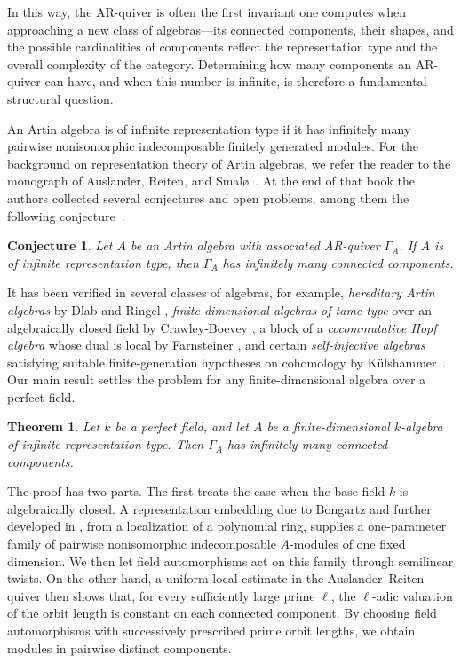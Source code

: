 \documentclass[11pt,letterpaper,reqno]{amsart}
\newtheorem{theorem}{Theorem}[section]
\newtheorem{conjecture}[conjecture]{Conjecture}
\theoremstyle{definition}
\begin{document}
In this way, the AR-quiver
is often the first invariant one computes when approaching a
new class of algebras---its connected components, their
shapes, and the possible cardinalities of components reflect
the representation type and the overall complexity of the
category.  Determining how many components an AR-quiver can
have, and when this number is infinite, is therefore a
fundamental structural question.

An Artin algebra is of infinite representation type if it has infinitely many pairwise nonisomorphic indecomposable finitely generated modules.
For the background on representation theory of Artin algebras, we refer the reader to the monograph of Auslander, Reiten, and
Smal{\o}~\cite{ARS}.  At the end of that book the authors collected
several conjectures and open problems, among them the following
conjecture~\cite[Conjecture~(3), p.~409]{ARS}.

\begin{conjecture}\label{conj:ars}
Let $A$ be an Artin algebra with associated AR-quiver $\Gamma_A$. If $A$ is of infinite representation type, then $\Gamma_A$ has infinitely many connected components.
\end{conjecture}

It has been verified in several classes of algebras, for example, \emph{hereditary Artin algebras} by Dlab and Ringel \cite{DlabRingel, Ringel78}, \emph{finite-dimensional algebras of tame type} over an algebraically closed field by Crawley-Boevey \cite{CrawleyBoevey}, a block of a \emph{cocommutative Hopf algebra} whose dual is local by Farnsteiner \cite{Farnsteiner00}, and certain \emph{self-injective algebras} satisfying suitable finite-generation hypotheses on cohomology by K\"ulshammer~\cite{Kuelshammer13,KuelshammerCorrigendum}. 
Our main result settles the problem for any finite-dimensional algebra over a perfect field.

\begin{theorem}\label{thm:main}
Let $k$ be a perfect field, and let $A$ be a finite-dimensional $k$-algebra
of infinite representation type.  Then $\Gamma_A$ has infinitely many
connected components.
\end{theorem}


The proof has two parts.  The first treats the case when the base field $k$ is algebraically
closed.  A representation embedding due to Bongartz \cite{Bongartz} and further developed in \cite{BPS}, from a localization of
a polynomial ring, supplies a one-parameter family of pairwise nonisomorphic
indecomposable $A$-modules of one fixed dimension.  We then let field
automorphisms act on this family through semilinear twists. On the other hand, a uniform local estimate in the Auslander--Reiten quiver then shows that, for every sufficiently large prime $\ell$, the $\ell$-adic valuation of the orbit length is constant on each connected component. By choosing field
automorphisms with successively prescribed prime orbit lengths, we obtain
modules in pairwise distinct components.
\end{document}
